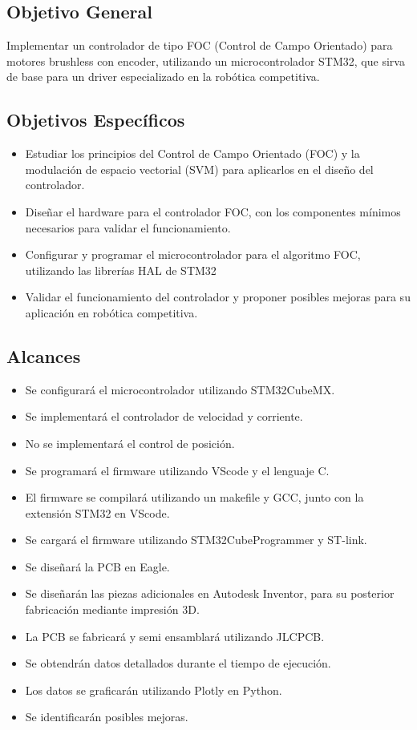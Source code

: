 \documentclass[11pt]{report}
\begin{document}
\subsection{Objetivo General}
Implementar un controlador de tipo FOC (Control de Campo Orientado) para motores brushless con encoder, utilizando un microcontrolador STM32, que sirva de base para un driver especializado en la robótica competitiva.

\subsection{Objetivos Específicos}
\begin{itemize}
	\item Estudiar los principios del Control de Campo Orientado (FOC) y la modulación de espacio vectorial (SVM) para aplicarlos en el diseño del controlador.
	\item Diseñar el hardware para el controlador FOC, con los componentes mínimos necesarios para validar el funcionamiento.
	\item Configurar y programar el microcontrolador para el algoritmo FOC, utilizando las librerías HAL de STM32
	\item Validar el funcionamiento del controlador y proponer posibles mejoras para su aplicación en robótica competitiva.
\end{itemize}

\newpage
\subsection{Alcances}
\begin{itemize}
	\item Se configurará el microcontrolador utilizando STM32CubeMX.
	\item Se implementará el controlador de velocidad y corriente.
	\item No se implementará el control de posición.
	\item Se programará el firmware utilizando VScode y el lenguaje C.
	\item El firmware se compilará utilizando un makefile y GCC, junto con la extensión STM32 en VScode.
	\item Se cargará el firmware utilizando STM32CubeProgrammer y ST-link.
	\item Se diseñará la PCB en Eagle.
	\item Se diseñarán las piezas adicionales en Autodesk Inventor, para su posterior fabricación mediante impresión 3D.
	\item La PCB se fabricará y semi ensamblará utilizando JLCPCB.
	\item Se obtendrán datos detallados durante el tiempo de ejecución.
	\item Los datos se graficarán utilizando Plotly en Python.
	\item Se identificarán posibles mejoras.
\end{itemize}
\end{document}
